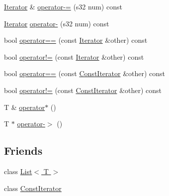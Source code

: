 \begin{DoxyCompactItemize}
\hyperlink{class_agmd_utilities_1_1_list_1_1_iterator}{Iterator} \& \hyperlink{class_agmd_utilities_1_1_list_1_1_iterator_adaa50ce93ad18c4f1b223bcd14dd69b6}{operator-\/=} (s32 num) const 
\item 
\hyperlink{class_agmd_utilities_1_1_list_1_1_iterator}{Iterator} \hyperlink{class_agmd_utilities_1_1_list_1_1_iterator_a2e636ea911ccbb498b6b7e5e93c3da15}{operator-\/} (s32 num) const 
\item 
bool \hyperlink{class_agmd_utilities_1_1_list_1_1_iterator_a8017df5a216b6e22ef1a7b6adc0fab03}{operator==} (const \hyperlink{class_agmd_utilities_1_1_list_1_1_iterator}{Iterator} \&other) const 
\item 
bool \hyperlink{class_agmd_utilities_1_1_list_1_1_iterator_a974d4e650a8fcc8d3e84c8b001ba7787}{operator!=} (const \hyperlink{class_agmd_utilities_1_1_list_1_1_iterator}{Iterator} \&other) const 
\item 
bool \hyperlink{class_agmd_utilities_1_1_list_1_1_iterator_a57b2035ae0e81e906241502716335774}{operator==} (const \hyperlink{class_agmd_utilities_1_1_list_1_1_const_iterator}{Const\+Iterator} \&other) const 
\item 
bool \hyperlink{class_agmd_utilities_1_1_list_1_1_iterator_a0825d1a995cc1ecfc78ede9751fd823f}{operator!=} (const \hyperlink{class_agmd_utilities_1_1_list_1_1_const_iterator}{Const\+Iterator} \&other) const 
\item 
T \& \hyperlink{class_agmd_utilities_1_1_list_1_1_iterator_a9ac51294da48bc8e9193d80404d01664}{operator$\ast$} ()
\item 
T $\ast$ \hyperlink{class_agmd_utilities_1_1_list_1_1_iterator_ae7ed83cce0c7eefcf277d50d3f5060c3}{operator-\/$>$} ()
\end{DoxyCompactItemize}
\subsection*{Friends}
\begin{DoxyCompactItemize}
\item 
class \hyperlink{class_agmd_utilities_1_1_list_1_1_iterator_adfa51a0eca1eba953f68ca3f65cdaa05}{List$<$ T $>$}
\item 
class \hyperlink{class_agmd_utilities_1_1_list_1_1_iterator_a5485970bb9da6b5d782fa28638b5658f}{Const\+Iterator}
\end{DoxyCompactItemize}


